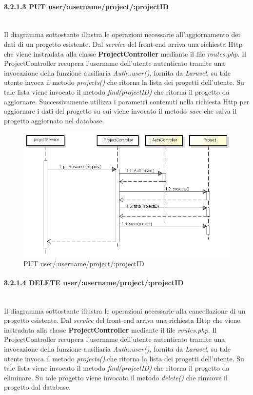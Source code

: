 \newpage

\paragraph{3.2.1.3 PUT user/:username/project/:projectID}\mbox{}\\
Il diagramma sottostante illustra le operazioni necessarie all'aggiornamento dei dati di un progetto esistente. Dal \textit{service} del front-end arriva una richiesta Http che viene instradata alla classe \textbf{ProjectController} mediante il file \textit{routes.php}. Il ProjectController recupera l'username dell'utente autenticato tramite una invocazione della funzione ausiliaria \textit{Auth::user()}, fornita da \textit{Laravel}, su tale utente invoca il metodo \textit{projects()} che ritorna la lista dei progetti dell'utente. Su tale lista viene invocato il metodo \textit{find(projectID)} che ritorna il progetto da aggiornare. Successivamente utilizza i parametri contenuti nella richiesta Http per aggiornare i dati del progetto su cui viene invocato il metodo \textit{save} che salva il progetto aggiornato nel database.

	\begin{figure}[h]
		\centering
		\includegraphics[width=0.6\linewidth]{img/PUT_project}
		\caption[PUT user/:username/project/:projectID]{PUT user/:username/project/:projectID}
		\label{fig:PUT user/:username/project/projectID}
	\end{figure}

\paragraph{3.2.1.4 DELETE user/:username/project/:projectID}\mbox{}\\
Il diagramma sottostante illustra le operazioni necessarie alla cancellazione di un progetto esistente. Dal \textit{service} del front-end arriva una richiesta Http che viene instradata alla classe \textbf{ProjectController} mediante il file \textit{routes.php}. Il ProjectController recupera l'username dell'utente autenticato tramite una invocazione della funzione ausiliaria \textit{Auth::user()}, fornita da \textit{Laravel}, su tale utente invoca il metodo \textit{projects()} che ritorna la lista dei progetti dell'utente. Su tale lista viene invocato il metodo \textit{find(projectID)} che ritorna il progetto da eliminare. Su tale progetto viene invocato il metodo \textit{delete()} che rimuove il progetto dal database.

